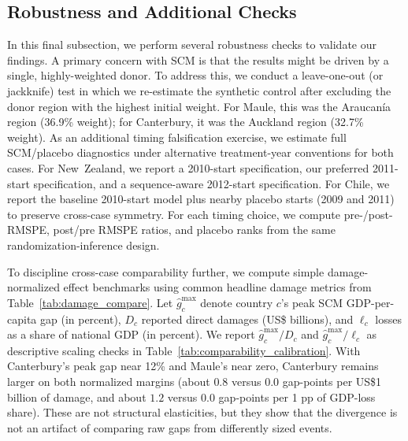 \documentclass[12pt]{article}
\begin{document}
\subsection{Robustness and Additional Checks}
\label{sec:robustness_checks}
In this final subsection, we perform several robustness checks to validate our findings. A primary concern with SCM is that the results might be driven by a single, highly-weighted donor. To address this, we conduct a leave-one-out (or jackknife) test in which we re-estimate the synthetic control after excluding the donor region with the highest initial weight. For Maule, this was the Araucanía region (36.9\% weight); for Canterbury, it was the Auckland region (32.7\% weight). As an additional timing falsification exercise, we estimate full SCM/placebo diagnostics under alternative treatment-year conventions for both cases. For New~Zealand, we report a 2010-start specification, our preferred 2011-start specification, and a sequence-aware 2012-start specification. For Chile, we report the baseline 2010-start model plus nearby placebo starts (2009 and 2011) to preserve cross-case symmetry. For each timing choice, we compute pre-/post-RMSPE, post/pre RMSPE ratios, and placebo ranks from the same randomization-inference design.

To discipline cross-case comparability further, we compute simple damage-normalized effect benchmarks using common headline damage metrics from Table~\ref{tab:damage_compare}. Let $\widehat{g}^{\max}_c$ denote country $c$'s peak SCM GDP-per-capita gap (in percent), $D_c$ reported direct damages (US\$ billions), and $\ell_c$ losses as a share of national GDP (in percent). We report $\widehat{g}^{\max}_c / D_c$ and $\widehat{g}^{\max}_c / \ell_c$ as descriptive scaling checks in Table~\ref{tab:comparability_calibration}. With Canterbury's peak gap near 12\% and Maule's near zero, Canterbury remains larger on both normalized margins (about $0.8$ versus $0.0$ gap-points per US\$1 billion of damage, and about $1.2$ versus $0.0$ gap-points per 1 pp of GDP-loss share). These are not structural elasticities, but they show that the divergence is not an artifact of comparing raw gaps from differently sized events.\\
\end{document}
